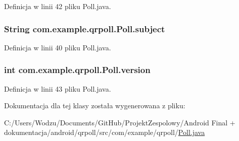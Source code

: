 Definicja w linii 42 pliku Poll.\+java.

\hypertarget{classcom_1_1example_1_1qrpoll_1_1_poll_ac710a3059ee7152dd6aa5e7bea399726}{
\subsubsection[{subject}]{\setlength{\rightskip}{0pt plus 5cm}String com.\+example.\+qrpoll.\+Poll.\+subject\hspace{0.3cm}{\ttfamily [private]}}}\label{classcom_1_1example_1_1qrpoll_1_1_poll_ac710a3059ee7152dd6aa5e7bea399726}


Definicja w linii 40 pliku Poll.\+java.

\hypertarget{classcom_1_1example_1_1qrpoll_1_1_poll_af8617455744b1f5935c9c4042345782c}{
\subsubsection[{version}]{\setlength{\rightskip}{0pt plus 5cm}int com.\+example.\+qrpoll.\+Poll.\+version\hspace{0.3cm}{\ttfamily [private]}}}\label{classcom_1_1example_1_1qrpoll_1_1_poll_af8617455744b1f5935c9c4042345782c}


Definicja w linii 43 pliku Poll.\+java.



Dokumentacja dla tej klasy została wygenerowana z pliku\+:\begin{DoxyCompactItemize}
\item 
C\+:/\+Users/\+Wodzu/\+Documents/\+Git\+Hub/\+Projekt\+Zespolowy/\+Android Final + dokumentacja/android/qrpoll/src/com/example/qrpoll/\hyperlink{_poll_8java}{Poll.\+java}\end{DoxyCompactItemize}
